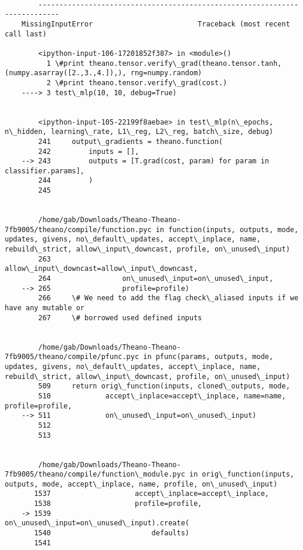 \documentclass{article}
\begin{document}
    \begin{Verbatim}[commandchars=\\\{\}]

        ---------------------------------------------------------------------------
    MissingInputError                         Traceback (most recent call last)

        <ipython-input-106-17201852f387> in <module>()
          1 \#print theano.tensor.verify\_grad(theano.tensor.tanh, (numpy.asarray([2.,3.,4.]),), rng=numpy.random)
          2 \#print theano.tensor.verify\_grad(cost.)
    ----> 3 test\_mlp(10, 10, debug=True)
    

        <ipython-input-105-22199f8aebae> in test\_mlp(n\_epochs, n\_hidden, learning\_rate, L1\_reg, L2\_reg, batch\_size, debug)
        241     output\_gradients = theano.function(
        242         inputs = [],
    --> 243         outputs = [T.grad(cost, param) for param in classifier.params],
        244         )
        245 


        /home/gab/Downloads/Theano-Theano-7fb9005/theano/compile/function.pyc in function(inputs, outputs, mode, updates, givens, no\_default\_updates, accept\_inplace, name, rebuild\_strict, allow\_input\_downcast, profile, on\_unused\_input)
        263                 allow\_input\_downcast=allow\_input\_downcast,
        264                 on\_unused\_input=on\_unused\_input,
    --> 265                 profile=profile)
        266     \# We need to add the flag check\_aliased inputs if we have any mutable or
        267     \# borrowed used defined inputs


        /home/gab/Downloads/Theano-Theano-7fb9005/theano/compile/pfunc.pyc in pfunc(params, outputs, mode, updates, givens, no\_default\_updates, accept\_inplace, name, rebuild\_strict, allow\_input\_downcast, profile, on\_unused\_input)
        509     return orig\_function(inputs, cloned\_outputs, mode,
        510             accept\_inplace=accept\_inplace, name=name, profile=profile,
    --> 511             on\_unused\_input=on\_unused\_input)
        512 
        513 


        /home/gab/Downloads/Theano-Theano-7fb9005/theano/compile/function\_module.pyc in orig\_function(inputs, outputs, mode, accept\_inplace, name, profile, on\_unused\_input)
       1537                    accept\_inplace=accept\_inplace,
       1538                    profile=profile,
    -> 1539                    on\_unused\_input=on\_unused\_input).create(
       1540                        defaults)
       1541 



\end{Verbatim}
\end{document}
